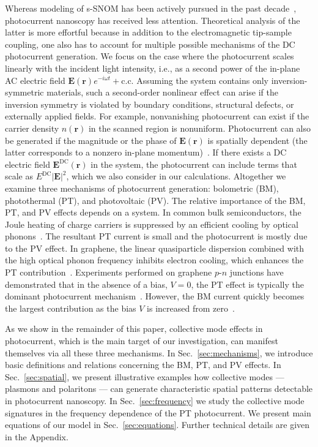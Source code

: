 \documentclass[aps, prb, reprint, superscriptaddress]{revtex4-2}
\renewcommand{\vec}{\mathbf}
\begin{document}
Whereas modeling of s-SNOM has been actively pursued in the past decade~\cite{Cvitkovic2007, McLeod2014, Jiang2016, Chen2021}, photocurrent nanoscopy has received less attention. 
Theoretical analysis of the latter is more effortful because
in addition to the electromagnetic tip-sample coupling,
one also has to account for multiple possible mechanisms of the DC photocurrent generation.
We focus on the case where the photocurrent scales linearly with the incident light intensity, i.e.,
as a second power of the in-plane AC electric field $\vec{E}(\vec{r}) e^{-i \omega t} + \mathrm{c.c}$.
Assuming the system contains only inversion-symmetric materials,
such a second-order nonlinear effect can arise if the inversion symmetry
is violated by boundary conditions, structural defects, or externally applied fields.
For example,
nonvanishing photocurrent can exist if the 
carrier density $n(\vec{r})$ in the
scanned region is nonuniform.
Photocurrent can also be generated if the magnitude or the phase 
of $\vec{E}(\vec{r})$ is spatially dependent
(the latter corresponds to a nonzero in-plane momentum)~\cite{Glazov2014}.
If there exists a DC electric field $\vec{E}^\mathrm{DC}(\vec{r})$ in the system,
the photocurrent can include terms that scale as $E^\mathrm{DC} |\vec{E}|^2$,
which we also consider in our calculations.
Altogether we examine three mechanisms of photocurrent generation:
bolometric (BM), photothermal (PT), and photovoltaic (PV).
The relative importance of the BM, PT, and PV effects depends on a system.
In common bulk semiconductors, the Joule heating of charge carriers is suppressed by an efficient cooling by optical phonons~\cite{Seeger2004}. 
The resultant PT current is small and the photocurrent is mostly due to the PV effect. 
In graphene, the linear quasiparticle dispersion combined with the high optical phonon frequency inhibits electron cooling, which enhances the PT contribution~\cite{Bistritzer2009, Song2011}.
Experiments performed on graphene $p$-$n$ junctions have demonstrated that in the absence of a bias, $V = 0$, the PT effect is typically the dominant photocurrent mechanism~\cite{Gabor2011}.
However, the BM current quickly becomes
the largest contribution as the bias $V$ is increased from zero~\cite{Freitag_2012}.

As we show in the remainder of this paper, collective mode effects in photocurrent, which is the main target of our investigation,
can manifest themselves via all these three mechanisms.
In Sec.~\ref{sec:mechanisms},
we introduce basic definitions and relations concerning the BM, PT, and PV effects.
In Sec.~\ref{sec:spatial},
we present illustrative examples how collective modes --- plasmons and polaritons ---
can generate characteristic spatial patterns detectable in photocurrent nanoscopy.
In Sec.~\ref{sec:frequency} we study
the collective mode signatures in the frequency dependence of the PT photocurrent.
We present main equations of our model in Sec.~\ref{sec:equations}.
Further technical details are given in the Appendix.
\end{document}
